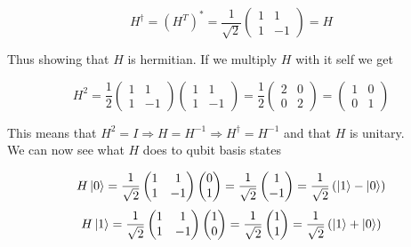 \documentclass[a4paper,norsk, 10pt]{article}
\begin{document}
\begin{equation}
H^\dagger = (H^T)^* = 
\frac{1}{\sqrt{2}}
\begin{pmatrix}
1 & 1 \\
1 & -1
\end{pmatrix}
= H
\end{equation}

Thus showing that $H$ is hermitian. If we multiply $H$ with it self we get

\begin{equation}
H^2 = \frac{1}{2}
\begin{pmatrix}
1 & 1 \\
1 & -1
\end{pmatrix}
\begin{pmatrix}
1 & 1 \\
1 & -1
\end{pmatrix}
=\frac{1}{2}
\begin{pmatrix}
2 & 0 \\
0 & 2
\end{pmatrix}
=
\begin{pmatrix}
1 & 0 \\
0 & 1
\end{pmatrix}
\end{equation}

This means that $H^2 = I \Rightarrow H = H^{-1} \Rightarrow H^\dagger = H^{-1}$ and that $H$ is unitary.\\

We can now see what $H$ does to qubit basis states

\begin{equation}
H\ket{0} = 
\frac{1}{\sqrt{2}}
\begin{pmatrix}
1 & 1 \\
1 & -1
\end{pmatrix}
\begin{pmatrix}
0 \\1
\end{pmatrix}
= \frac{1}{\sqrt{2}}
\begin{pmatrix}
1 \\ -1
\end{pmatrix}
=\frac{1}{\sqrt{2}}\left(\ket{1} - \ket{0}\right)
\end{equation}
\begin{equation}
H\ket{1} = 
\frac{1}{\sqrt{2}}
\begin{pmatrix}
1 & 1 \\
1 & -1
\end{pmatrix}
\begin{pmatrix}
1 \\ 0
\end{pmatrix}
= \frac{1}{\sqrt{2}}
\begin{pmatrix}
1 \\ 1
\end{pmatrix}
=\frac{1}{\sqrt{2}}\left(\ket{1} + \ket{0}\right)
\end{equation}
\end{document}
